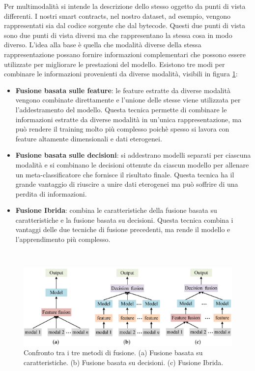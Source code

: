 \documentclass[../../Thesis.tex]{subfiles}
\begin{document}
Per multimodalit\`a si intende la descrizione dello stesso oggetto da punti di vista differenti. I nostri smart contracts, nel nostro dataset, ad esempio, vengono rappresentati sia dal codice sorgente che dal bytecode. Questi due punti di vista sono due punti di vista diversi ma che rappresentano la stessa cosa in modo diverso. L'idea alla base \`e quella che modalit\`a diverse della stessa rappresentazione possano fornire informazioni complementari che possono essere utilizzate per migliorare le prestazioni del modello. Esistono tre modi per combinare le informazioni provenienti da diverse modalit\`a, visibili in figura \ref{fig:fusion_methods}:
\begin{itemize}
    \item \textbf{Fusione basata sulle feature}: le feature estratte da diverse modalit\`a vengono combinate direttamente e l'unione delle stesse viene utilizzata per l'addestramento del modello. Questa tecnica permette di combinare le informazioni estratte da diverse modalit\`a in un'unica rappresentazione, ma pu\`o rendere il training molto pi\`u complesso poich\`e spesso si lavora con feature altamente dimensionali e dati eterogenei.
    \item \textbf{Fusione basata sulle decisioni}: si addestrano modelli separati per ciascuna modalit\`a e si combinano le decisioni ottenute da ciascun modello per allenare un meta-classificatore che fornisce il risultato finale. Questa tecnica ha il grande vantaggio di riuscire a unire dati eterogenei ma pu\`o soffrire di una perdita di informazioni.
    \item \textbf{Fusione Ibrida}: combina le caratteristiche della fusione basata su caratteristiche e la fusione basata su decisioni. Questa tecnica combina i vantaggi delle due tecniche di fusione precedenti, ma rende il modello e l'apprendimento pi\`u complesso.
\end{itemize} 
\
\begin{figure}[h]
    \centering
    \includegraphics[width=\textwidth]{../../img/fusion_methods.png}
    \caption{Confronto tra i tre metodi di fusione. (a) Fusione basata su caratteristiche. (b) Fusione basata su decisioni. (c) Fusione Ibrida.}
    \label{fig:fusion_methods}
\end{figure}
\end{document}
